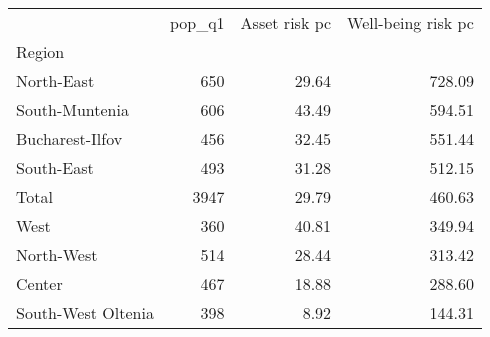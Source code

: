 \begin{tabular}{lrrr}
\toprule
{} &  pop\_q1 &  Asset risk pc &  Well-being risk pc \\
Region             &         &                &                     \\
\midrule
North-East         &     650 &          29.64 &              728.09 \\
South-Muntenia     &     606 &          43.49 &              594.51 \\
Bucharest-Ilfov    &     456 &          32.45 &              551.44 \\
South-East         &     493 &          31.28 &              512.15 \\
Total              &    3947 &          29.79 &              460.63 \\
West               &     360 &          40.81 &              349.94 \\
North-West         &     514 &          28.44 &              313.42 \\
Center             &     467 &          18.88 &              288.60 \\
South-West Oltenia &     398 &           8.92 &              144.31 \\
\bottomrule
\end{tabular}

